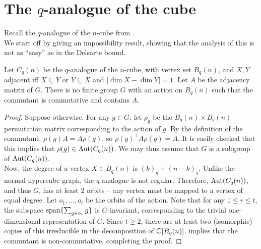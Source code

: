 
\clearpage
\section{The $q$-analogue of the cube}

Recall the $q$-analogue of the $n$-cube from .\\
We start off by giving an impossibility result, showing that the analysis of this is not as ``easy'' as in the Delsarte bound.

\begin{ftheo}
	Let $C_q(n)$ be the $q$-analogue of the $n$-cube, with vertex set $B_q(n)$, and $X,Y$ adjacent iff $X \subseteq Y$ or $Y \subseteq X$ and $|\dim X - \dim Y| = 1$. Let $A$ be the adjacency matrix of $G$. There is no finite group $G$ with an action on $B_q(n)$ such that the commutant is commutative and contains $A$.
\end{ftheo}
\begin{proof}
	Suppose otherwise. For any $g \in G$, let $\rho_g$ be the $B_q(n) \times B_q(n)$ permutation matrix corresponding to the action of $g$. By the definition of the commutant, $\rho(g) A = A \rho(g)$, so $\rho(g)^\top A \rho(g) = A$. It is easily checked that this implies that $\rho(g) \in \operatorname{Aut}(C_q(n))$. We may thus assume that $G$ is a subgroup of $\operatorname{Aut}(C_q(n))$.\\
	Now, the degree of a vertex $X \in B_q(n)$ is $(k)_q + (n-k)_q$. Unlike the normal hypercube graph, the $q$-analogue is not regular. Therefore, $\operatorname{Aut}(C_q(n))$, and thus $G$, has at least $2$ orbits -- any vertex must be mapped to a vertex of equal degree. Let $o_1,\ldots,o_t$ be the orbits of the action. Note that for any $1 \le r \le t$, the subspace $\operatorname{span}\{\sum_{g \in o_r} g\}$ is $G$-invariant, corresponding to the trivial one-dimensional representation of $G$. Since $t \ge 2$, there are at least two (isomorphic) copies of this irreducible in the decomposition of $\mathbb{C}[B_q(n)]$.  implies that the commutant is non-commutative, completing the proof.
\end{proof}

